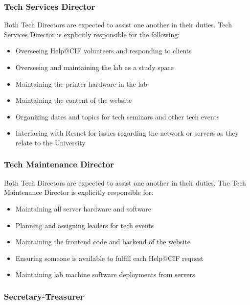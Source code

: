 		\subsubsection{Tech Services Director}\label{ssub:tech-services-director}

Both Tech Directors are expected to assist one another in their duties. Tech Services Director is explicitly responsible for the following:
\begin{itemize}
	\item Overseeing Help@CIF volunteers and responding to clients
	\item Overseeing and maintaining the lab as a study space
	\item Maintaining the printer hardware in the lab
	\item Maintaining the content of the website
	\item Organizing dates and topics for tech seminars and other tech events
	\item Interfacing with Resnet for issues regarding the network or servers as they relate to the University
\end{itemize}



		\subsubsection{Tech Maintenance Director}\label{ssub:tech-maintenance-director}

Both Tech Directors are expected to assist one another in their duties. The Tech Maintenance Director is explicitly responsible for:
\begin{itemize}
	\item Maintaining all server hardware and software
	\item Planning and assigning leaders for tech events
	\item Maintaining the frontend code and backend of the website
	\item Ensuring someone is available to fulfill each Help@CIF request
	\item Maintaining lab machine software deployments from servers
\end{itemize}



		\subsubsection{Secretary-Treasurer}\label{ssub:secretary-treasurer}

